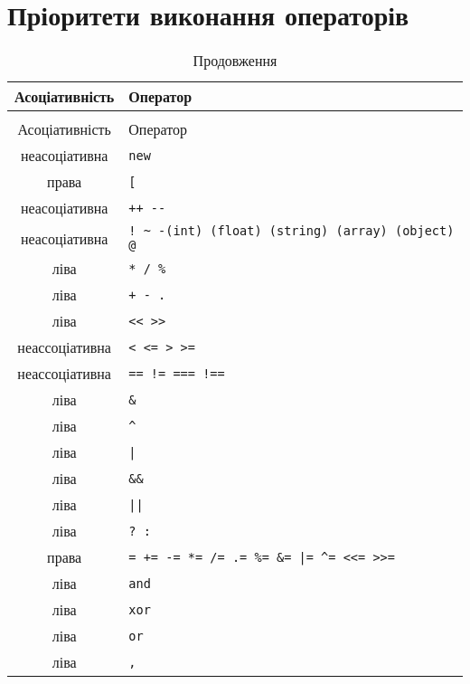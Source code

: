 \section{Пріоритети виконання операторів}


\begin{center}
\begin{longtable}[t]{|c|p{25em}|}
\caption{Пріоритети виконання операторів} \label{pr-op:table}\\
\hline

Асоціативність & Оператор \\
\hline \endfirsthead
\caption*{\space Продовження} \\
\hline
Асоціативність & Оператор \\
\hline \endhead
\hline \endfoot
неасоціативна	& \verb|new| \\
права	& \verb|[|\\
неасоціативна	& \verb|++ --| \\
неасоціативна	& \verb|! ~ -(int) (float) (string) (array) (object) @| \\
ліва	& \verb|* / %| \\
ліва	& \verb|+ - .| \\
ліва	& \verb|<< >>| \\
неассоціативна	& \verb|< <= > >=| \\
неассоціативна	& \verb|== != === !==| \\
ліва	& \verb|&| \\
ліва	& \verb|^| \\
ліва	& \verb'|' \\
ліва	& \verb|&&| \\
ліва	& \verb'||' \\
ліва	& \verb|? :| \\
права	& \verb'= += -= *= /= .= %= &= |= ^= <<= >>='  \\
\penalty -10000
ліва	& \verb|and| \\
ліва	& \verb|xor| \\
ліва	& \verb|or| \\
ліва	& \verb|,| \\

\hline
\end{longtable}
\end{center}